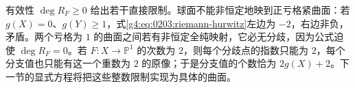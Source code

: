 有效性 \(\deg R_F\ge0\) 给出若干直接限制。球面不能非恒定地映到正亏格紧曲面：若 \(g(X)=0\)、\(g(Y)\ge1\)，式\eqref{g4:eq:0203:riemann-hurwitz}左边为 \(-2\)，右边非负，矛盾。两个亏格为 \(1\) 的曲面之间若有非恒定全纯映射，它必无分歧，因为公式迫使 \(\deg R_F=0\)。若 \(F:X\rightarrow\mathbb P^1\) 的次数为 \(2\)，则每个分歧点的指数只能为 \(2\)，每个分支值也只能有这一个重数为 \(2\) 的原像；于是分支值的个数恰为 \(2g(X)+2\)。下一节的显式方程将把这些整数限制实现为具体的曲面。
